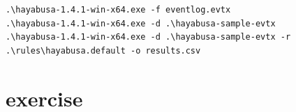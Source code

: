 \begin{verbatim}
.\hayabusa-1.4.1-win-x64.exe -f eventlog.evtx
.\hayabusa-1.4.1-win-x64.exe -d .\hayabusa-sample-evtx
.\hayabusa-1.4.1-win-x64.exe -d .\hayabusa-sample-evtx -r .\rules\hayabusa.default -o results.csv
\end{verbatim}

\section{exercise}



